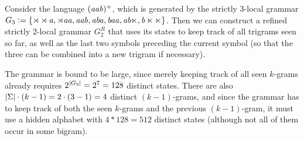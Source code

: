 \begin{examplebox}
    Consider the language $(\mathit{aab})^+$, which is generated by the strictly $3$-local grammar
    \(
        G_3 \mathrel{\mathop:}= \left \{ 
            \mathit{\rtimes \rtimes a},
            \mathit{\rtimes a a},
            \mathit{a a b},
            \mathit{a b a},
            \mathit{b a a},
            \mathit{a b \ltimes},
            \mathit{b \ltimes \ltimes}
         \right \}
    \).
    Then we can construct a refined strictly $2$-local grammar $G^R_2$ that uses its states to keep track of all trigrams seen so far, as well as the last two symbols preceding the current symbol (so that the three can be combined into a new trigram if necessary).

    The grammar is bound to be large, since merely keeping track of all seen $k$-grams already requires $2^{| G_3 |} = 2^7 = 128$ distinct states.
    There are also $| \Sigma | \cdot (k -1) = 2 \cdot (3 - 1) = 4$ distinct $(k-1)$-grams, and since the grammar has to keep track of both the seen $k$-grams and the previous $(k-1)$-gram, it must use a hidden alphabet with $4 * 128 = 512$ distinct states (although not all of them occur in some bigram).


\end{examplebox}
